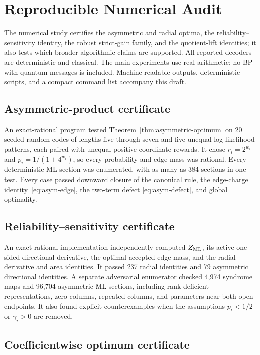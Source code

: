 \documentclass[journal]{IEEEtran}
\theoremstyle{definition}
\theoremstyle{remark}
\begin{document}
\section{Reproducible Numerical Audit}
\label{sec:numerics}

The numerical study certifies the asymmetric and radial optima, the
reliability--sensitivity identity, the robust strict-gain family, and the
quotient-lift identities; it also tests which
broader algorithmic claims are supported.  All reported decoders are
deterministic and classical.  The main experiments use real arithmetic; no BP
with quantum messages is included.  Machine-readable outputs, deterministic
scripts, and a compact command list accompany this draft.

\subsection{Asymmetric-product certificate}

An exact-rational program tested Theorem~\ref{thm:asymmetric-optimum} on 20
seeded random codes of lengths five through seven and five unequal
log-likelihood patterns, each paired with unequal positive coordinate
rewards.  It chose $r_i=2^{w_i}$ and
$p_i=1/(1+4^{w_i})$, so every probability and edge mass was rational.
Every deterministic ML section was enumerated, with as many as 384 sections
in one test.  Every case passed downward closure of the canonical rule, the
edge-charge identity~\eqref{eq:asym-edge}, the two-term defect
\eqref{eq:asym-defect}, and global optimality.

\subsection{Reliability--sensitivity certificate}

An exact-rational implementation independently computed $Z_{\rm ML}$, its
active one-sided directional derivative, the optimal accepted-edge mass, and
the radial derivative and area identities.  It passed 237 radial identities
and 79 asymmetric directional identities.  A separate adversarial enumerator
checked 4,974 syndrome maps and 96,704 asymmetric ML sections, including
rank-deficient representations, zero columns, repeated columns, and parameters
near both open endpoints.  It also found explicit counterexamples when the
assumptions $p_i<1/2$ or $\gamma_i>0$ are removed.

\subsection{Coefficientwise optimum certificate}
\end{document}
